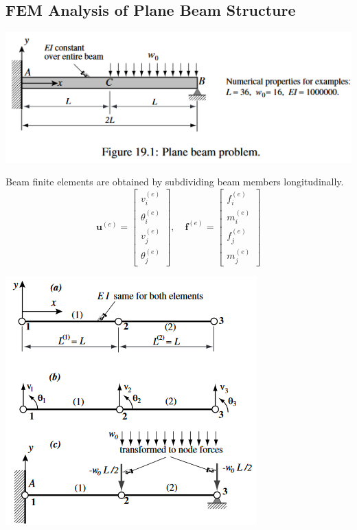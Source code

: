 \documentclass{article}
\begin{document}
\begin{multicols*}{2}
    \subsection*{FEM Analysis of Plane Beam Structure}

    \begin{center}
    \includegraphics[width=0.75\linewidth]{Figures/FEM_plane_beam.png}\par 
    Beam finite elements are obtained by subdividing beam members longitudinally.
    \begin{equation*}
        \textbf{u}^{(e)} = 
        \begin{bmatrix}
            v_i^{(e)}\\
            \theta_i^{(e)}\\
            v_j^{(e)}\\
            \theta_j^{(e)}
        \end{bmatrix},
        \quad
        \textbf{f}^{(e)} = 
        \begin{bmatrix}
            f_i^{(e)}\\
            m_i^{(e)}\\
            f_j^{(e)}\\
            m_j^{(e)}
        \end{bmatrix}
    \end{equation*}

    \includegraphics[width=0.5\linewidth]{Figures/FEM_plane_beam_2.png}
    \end{center}


\end{multicols*}
\end{document}
